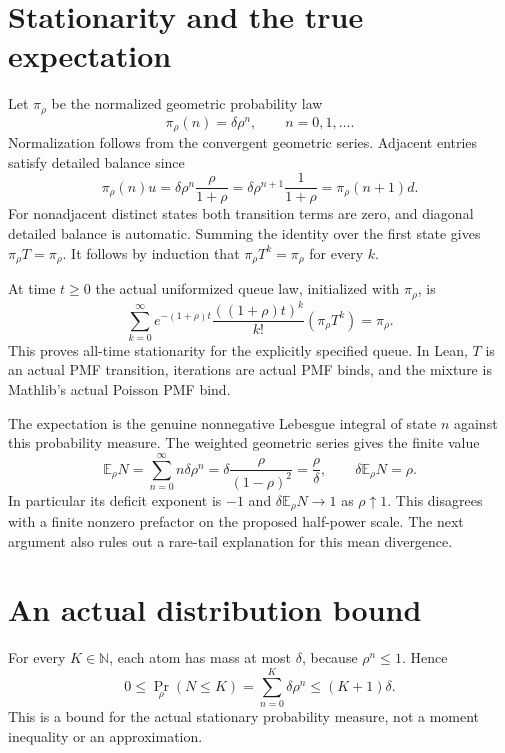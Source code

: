 \documentclass[11pt]{article}
\begin{document}
\section*{Stationarity and the true expectation}
Let $\pi_\rho$ be the normalized geometric probability law
\[
                    \pi_\rho(n)=\delta\rho^n,
                      \qquad n=0,1,\ldots.
\]
Normalization follows from the convergent geometric
series. Adjacent entries satisfy detailed balance since
\[
 \pi_\rho(n)u
   =\delta\rho^n\frac\rho{1+\rho}
   =\delta\rho^{n+1}\frac1{1+\rho}
   =\pi_\rho(n+1)d.
\]
For nonadjacent distinct states both transition terms
are zero, and diagonal detailed balance is automatic.
Summing the identity over the first state gives
$\pi_\rho T=\pi_\rho$. It follows by induction that
$\pi_\rho T^k=\pi_\rho$ for every $k$.

At time $t\geq0$ the actual uniformized queue law,
initialized with $\pi_\rho$, is
\[
 \sum_{k=0}^{\infty}
   e^{-(1+\rho)t}\frac{((1+\rho)t)^k}{k!}
             (\pi_\rho T^k)=\pi_\rho.
\]
This proves all-time stationarity for the explicitly
specified queue. In Lean, $T$ is an actual PMF transition,
iterations are actual PMF binds, and the mixture is
Mathlib's actual Poisson PMF bind.

The expectation is the genuine nonnegative Lebesgue
integral of state $n$ against this probability measure.
The weighted geometric series gives the finite value
\[
 \mathbb E_\rho N
   =\sum_{n=0}^{\infty}n\delta\rho^n
   =\delta\frac\rho{(1-\rho)^2}
   =\frac\rho\delta,
       \qquad \delta\mathbb E_\rho N=\rho.
\]
In particular its deficit exponent is $-1$ and
$\delta\mathbb E_\rho N\to1$ as $\rho\uparrow1$.
This disagrees with a finite nonzero prefactor on the
proposed half-power scale. The next argument also rules
out a rare-tail explanation for this mean divergence.

\section*{An actual distribution bound}
For every $K\in\mathbb N$, each atom has mass at most
$\delta$, because $\rho^n\leq1$. Hence
\[
       0\leq\Pr_\rho(N\leq K)
              =\sum_{n=0}^{K}\delta\rho^n
                    \leq(K+1)\delta.
\]
This is a bound for the actual stationary probability
measure, not a moment inequality or an approximation.

\newpage
\end{document}
